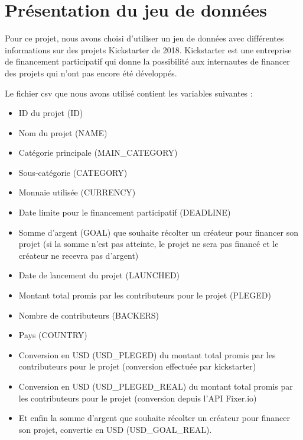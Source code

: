 \documentclass{article}
\begin{document}
\section{Présentation du jeu de données}

Pour ce projet, nous avons choisi d'utiliser un jeu de données avec différentes informations sur des projets Kickstarter de 2018. Kickstarter est une entreprise de financement participatif qui donne la possibilité aux internautes de financer des projets qui n'ont pas encore été développés.\newline 

\noindent Le fichier csv que nous avons utilisé contient les variables suivantes : \newline 
\begin{itemize}
    \item ID du projet (ID)
    \item Nom du projet (NAME)
    \item Catégorie principale (MAIN\_CATEGORY)
    \item Sous-catégorie (CATEGORY)
    \item Monnaie utilisée (CURRENCY)
    \item Date limite pour le financement participatif (DEADLINE)
    \item Somme d'argent (GOAL) que souhaite récolter un créateur pour financer son projet (si la somme n'est pas atteinte, le projet ne sera pas financé et le créateur ne recevra pas d'argent)
    \item Date de lancement du projet (LAUNCHED)
    \item Montant total promis par les contributeurs pour le projet (PLEGED)
    \item Nombre de contributeurs (BACKERS)
    \item Pays (COUNTRY)
    \item Conversion en USD (USD\_PLEGED) du montant total promis par les contributeurs pour le projet (conversion effectuée par kickstarter) 
    \item Conversion en USD (USD\_PLEGED\_REAL) du montant total promis par les contributeurs pour le projet (conversion depuis l'API Fixer.io)
    \item Et enfin la somme d'argent que souhaite récolter un créateur pour financer son projet, convertie en USD (USD\_GOAL\_REAL).\newline 

\end{itemize}
\end{document}
